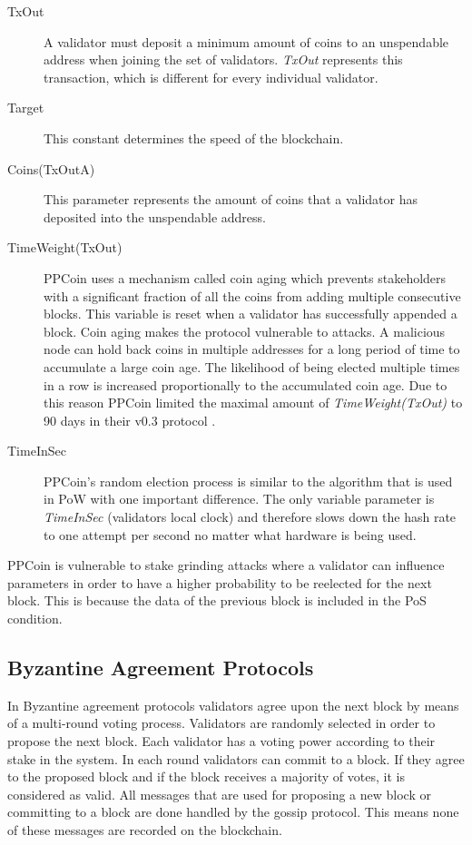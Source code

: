 \begin{description}
	\item[TxOut] A validator must deposit a minimum amount of coins to an unspendable address when joining the set of validators. \textit{TxOut} represents this transaction, which is different for every individual validator.
	
	\item[Target] This constant determines the speed of the blockchain.
	
	\item[Coins(TxOutA)] This parameter represents the amount of coins that a validator has deposited into the unspendable address.
	
	\item[TimeWeight(TxOut)] PPCoin uses a mechanism called coin aging \cite{ppcoin_paper} which prevents stakeholders with a significant fraction of all the coins from adding multiple consecutive blocks. This variable is reset when a validator has successfully appended a block. Coin aging makes the protocol vulnerable to attacks. A malicious node can hold back coins in multiple addresses for a long period of time to accumulate a large coin age. The likelihood of being elected multiple times in a row is increased proportionally to the accumulated coin age. Due to this reason PPCoin limited the maximal amount of \textit{TimeWeight(TxOut)} to 90 days in their v0.3 protocol \cite{cryptocurrencies-without-pow}.
	
	\item[TimeInSec] PPCoin's random election process is similar to the algorithm that is used in PoW with one important difference. The only variable parameter is \textit{TimeInSec} (validators local clock) and therefore slows down the hash rate to one attempt per second no matter what hardware is being used.
\end{description}

PPCoin is vulnerable to stake grinding attacks where a validator can influence parameters in order to have a higher probability to be reelected for the next block. This is because the data of the previous block is included in the PoS condition. \cite{ethereum_faq}

\subsection{Byzantine Agreement Protocols}
In Byzantine agreement protocols validators agree upon the next block by means of a multi-round voting process. Validators are randomly selected in order to propose the next block. Each validator has a voting power according to their stake in the system. In each round validators can commit to a block. If they agree to the proposed block and if the block receives a majority of votes, it is considered as valid. All messages that are used for proposing a new block or committing to a block are done handled by the gossip protocol. This means none of these messages are recorded on the blockchain.

